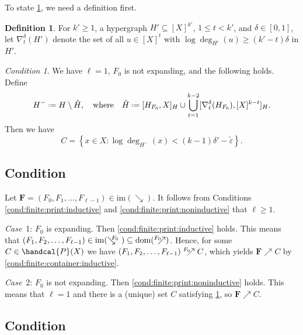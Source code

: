 \documentclass[12pt,reqno]{amsart}
\theoremstyle{plain}
\theoremstyle{definition}
\newtheorem{defn}[equation]{Definition}
\theoremstyle{remark}
\newtheorem{condition}[equation]{Condition}
\newenvironment{case}[2]{\smallskip\par\noindent \textit{Case}~#1: \rmfamily #2.}{}
\newcommand{\0}{\mathbb{\emptyset}}
\newcommand{\Pow}{\handcal{P}}
\newcommand{\set}[1]{\left\{ #1 \right\}}
\newcommand*{\defeq}{\mathrel{\vcenter{\baselineskip0.5ex \lineskiplimit0pt \hbox{\scriptsize.}\hbox{\scriptsize.}}}=}
\newcommand{\de}{\delta}
\newcommand{\e}{\varepsilon}
\newcommand{\dom}{\mathrm{dom}}
\newcommand{\im}{\mathrm{im}}
\newcommand{\Print}{\boldsymbol{F}}
\newcommand{\prel}{\searrow}
\newcommand{\crel}{\nearrow}
\newcommand{\prelG}[1]{\mathrel{\;\:\mathclap{\searrow}{{}^{#1}}\;}}
\newcommand{\crelG}[1]{\mathrel{{}^{#1}\mathclap{\nearrow}{\;\:}}}
\begin{document}
To state \cref{cond:smalldeg}, we need a definition first.

\begin{defn}\label{defn:nabla}
	For $k' \ge 1$, a hypergraph $H' \subseteq [X]^{k'}$, $1 \le t < k'$, and $\de \in [0,1]$, let $\nabla_t^\de(H')$ denote the set of all $u \in [X]^t$ with $\log \deg_{H'}(u) \ge (k'-t) \de$ in $H'$.
\end{defn}

\begin{condition}\label{cond:smalldeg}
	We have $\ell = 1$, $F_0$ is not expanding, and the following holds. Define
	\begin{equation}\label{eq:finite:H-hat}
	H^- \defeq H \setminus \hat{H}, \quad \text{where} \quad \hat{H} \defeq [H_{F_0}, X]_H \cup \bigcup_{t = 1}^{k-2} [\nabla_t^\de(H_{F_0}), [X]^{k-t}]_H.
	\end{equation}
	Then we have
	\begin{equation}\label{eq:finite:C}
	C = \set{x \in X : \log\deg_{H^-}(x) < (k-1) \de' - \tilde\e}.
	\end{equation}
\end{condition}

\subsection{Condition }

Let $\Print = (F_0, F_1, \hdots, F_{\ell-1}) \in \im(\prel)$. It follows from Conditions \ref{cond:finite:print:inductive} and \ref{cond:finite:print:noninductive} that $\ell \geq 1$.

\begin{case}{1}{$F_0$ is expanding}
	Then \cref{cond:finite:print:inductive} holds. This means that $(F_1, F_2, \hdots, F_{\ell-1}) \in \im(\prelG{F_0}) \subseteq \dom(\crelG{F_0})$. Hence, for some $C \in \Pow(X)$ we have $(F_1, F_2, \hdots, F_{\ell-1}) \crelG{F_0} C$, which yields $\Print \crel C$ by \cref{cond:finite:container:inductive}.
\end{case}

\begin{case}{2}{$F_0$ is not expanding}
	Then \cref{cond:finite:print:noninductive} holds. This means that $\ell = 1$ and there is a (unique) set $C$ satisfying \cref{cond:smalldeg}, so $\Print \crel C$.
\end{case}

\subsection{Condition }
\end{document}
